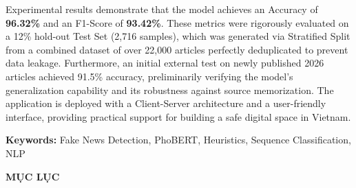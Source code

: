 \documentclass[12pt,a4paper]{article}
\makeatletter
\renewcommand\tableofcontents{%
    \begin{center}{\bfseries\Large MỤC LỤC}\end{center}%
    \vspace{0.45cm}%
    \@starttoc{toc}%
}
\makeatother
\begin{document}
Experimental results demonstrate that the model achieves an Accuracy of \textbf{96.32\%} and an F1-Score of \textbf{93.42\%}. These metrics were rigorously evaluated on a 12\% hold-out Test Set (2,716 samples), which was generated via Stratified Split from a combined dataset of over 22,000 articles perfectly deduplicated to prevent data leakage. Furthermore, an initial external test on newly published 2026 articles achieved 91.5\% accuracy, preliminarily verifying the model's generalization capability and its robustness against source memorization. The application is deployed with a Client-Server architecture and a user-friendly interface, providing practical support for building a safe digital space in Vietnam.

\vspace{0.65cm}
\textbf{Keywords:} Fake News Detection, PhoBERT, Heuristics, Sequence Classification, NLP
\newpage

\tableofcontents
\newpage

\renewcommand{\listfigurename}{\begin{center}{\bfseries\Large DANH MỤC HÌNH ẢNH}\end{center}}
\listoffigures
\newpage

\renewcommand{\listtablename}{\begin{center}{\bfseries\Large DANH MỤC BẢNG BIỂU}\end{center}}
\listoftables
\newpage
\end{document}
